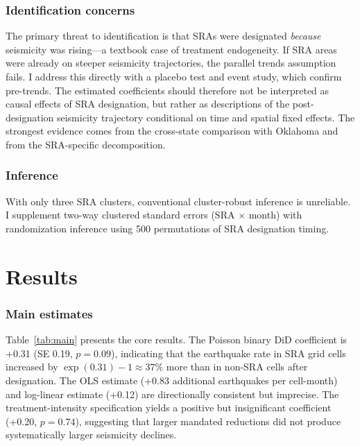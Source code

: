 \documentclass[12pt]{article}
\begin{document}
\subsubsection*{Identification concerns} The primary threat to identification is that SRAs were designated \textit{because} seismicity was rising---a textbook case of treatment endogeneity. If SRA areas were already on steeper seismicity trajectories, the parallel trends assumption fails. I address this directly with a placebo test and event study, which confirm pre-trends. The estimated coefficients should therefore not be interpreted as causal effects of SRA designation, but rather as descriptions of the post-designation seismicity trajectory conditional on time and spatial fixed effects. The strongest evidence comes from the cross-state comparison with Oklahoma and from the SRA-specific decomposition.

\subsubsection*{Inference} With only three SRA clusters, conventional cluster-robust inference is unreliable. I supplement two-way clustered standard errors (SRA $\times$ month) with randomization inference using 500 permutations of SRA designation timing.

\section{Results}

\subsubsection*{Main estimates} Table~\ref{tab:main} presents the core results. The Poisson binary DiD coefficient is +0.31 (SE 0.19, $p = 0.09$), indicating that the earthquake rate in SRA grid cells increased by $\exp(0.31) - 1 \approx 37\%$ more than in non-SRA cells after designation. The OLS estimate (+0.83 additional earthquakes per cell-month) and log-linear estimate (+0.12) are directionally consistent but imprecise. The treatment-intensity specification yields a positive but insignificant coefficient (+0.20, $p = 0.74$), suggesting that larger mandated reductions did not produce systematically larger seismicity declines.


\end{document}
